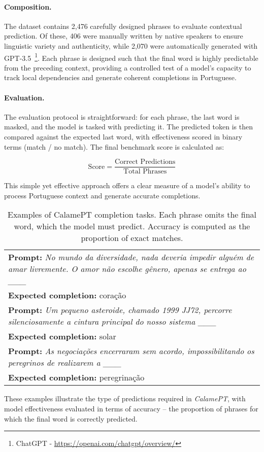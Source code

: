 \paragraph{Composition.}
The dataset contains 2,476 carefully designed phrases to evaluate contextual prediction. Of these, 406 were manually written by native speakers to ensure linguistic variety and authenticity, while 2,070 were automatically generated with GPT-3.5~\footnote{ChatGPT - \url{https://openai.com/chatgpt/overview/}}. Each phrase is designed such that the final word is highly predictable from the preceding context, providing a controlled test of a model’s capacity to track local dependencies and generate coherent completions in Portuguese.

\paragraph{Evaluation.}
The evaluation protocol is straightforward: for each phrase, the last word is masked, and the model is tasked with predicting it. The predicted token is then compared against the expected last word, with effectiveness scored in binary terms (match / no match). The final benchmark score is calculated as:  

$$
\text{Score} = \frac{\text{Correct Predictions}}{\text{Total Phrases}}
$$

This simple yet effective approach offers a clear measure of a model’s ability to process Portuguese context and generate accurate completions.


\begin{table}[H]
    \centering
    \begin{tabular}{|p{14cm}|}
        \hline
        \textbf{Prompt:} \textit{No mundo da diversidade, nada deveria impedir alguém de amar livremente. O amor não escolhe gênero, apenas se entrega ao \_\_\_} \\
        \textbf{Expected completion:} coração \\
        \hline
        \textbf{Prompt:} \textit{Um pequeno asteroide, chamado 1999 JJ72, percorre silenciosamente a cintura principal do nosso sistema \_\_\_} \\
        \textbf{Expected completion:} solar \\
        \hline
        \textbf{Prompt:} \textit{As negociações encerraram sem acordo, impossibilitando os peregrinos de realizarem a \_\_\_} \\
        \textbf{Expected completion:} peregrinação \\
        
        \hline
    \end{tabular}
    \caption{Examples of CalamePT completion tasks. Each phrase omits the final word, which the model must predict. Accuracy is computed as the proportion of exact matches.}
    \label{tab:calamept-examples}
\end{table}

These examples illustrate the type of predictions required in \emph{CalamePT}, with model effectiveness evaluated in terms of accuracy -- the proportion of phrases for which the final word is correctly predicted.
